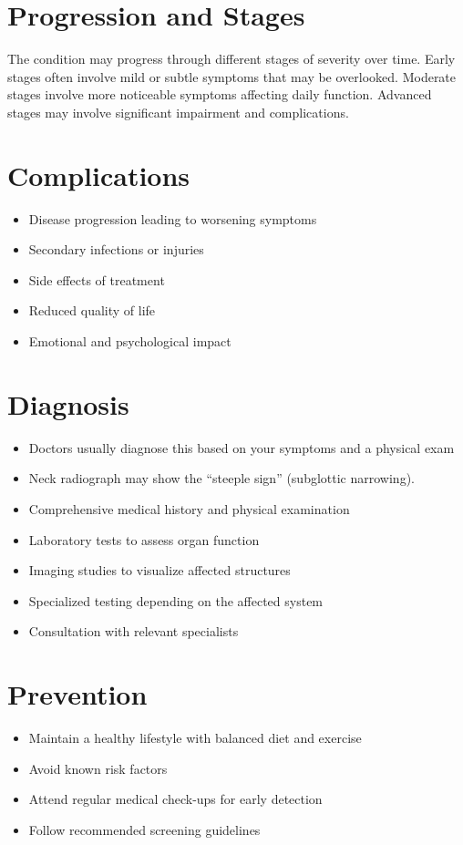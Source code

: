 \section{Progression and Stages}
The condition may progress through different stages of severity over time. Early stages often involve mild or subtle symptoms that may be overlooked. Moderate stages involve more noticeable symptoms affecting daily function. Advanced stages may involve significant impairment and complications.
\section{Complications}
\begin{itemize}[noitemsep]
  \item Disease progression leading to worsening symptoms
  \item Secondary infections or injuries
  \item Side effects of treatment
  \item Reduced quality of life
  \item Emotional and psychological impact
\end{itemize}
\section{Diagnosis}
\begin{itemize}[noitemsep]
  \item Doctors usually diagnose this based on your symptoms and a physical exam
  \item Neck radiograph may show the ``steeple sign'' (subglottic narrowing).
  \item Comprehensive medical history and physical examination
  \item Laboratory tests to assess organ function
  \item Imaging studies to visualize affected structures
  \item Specialized testing depending on the affected system
  \item Consultation with relevant specialists
\end{itemize}
\section{Prevention}
\begin{itemize}[noitemsep]
  \item Maintain a healthy lifestyle with balanced diet and exercise
  \item Avoid known risk factors
  \item Attend regular medical check-ups for early detection
  \item Follow recommended screening guidelines
\end{itemize}
